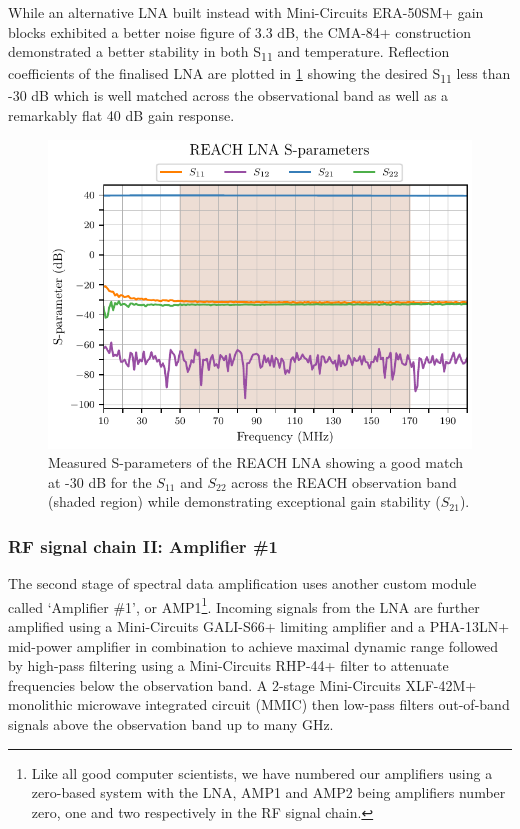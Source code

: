 While an alternative LNA built instead with Mini-Circuits ERA-50SM+ gain blocks exhibited a better noise figure of 3.3 dB, the CMA-84+ construction demonstrated a better stability in both S\textsubscript{11} and temperature. Reflection coefficients of the finalised LNA are plotted in \cref{fig:lna_sparams} showing the desired S\textsubscript{11} less than -30 dB which is well matched across the observational band as well as a remarkably flat 40 dB gain response.
\begin{figure}[t]
    \centering
    \includegraphics{lna_sparams}
    \caption{Measured S-parameters of the REACH LNA showing a good match at -30 dB for the $S_{11}$ and $S_{22}$ across the REACH observation band (shaded region) while demonstrating exceptional gain stability ($S_{21}$).}
    \label{fig:lna_sparams}
\end{figure}


\subsubsection{RF signal chain II: Amplifier \#1}
The second stage of spectral data amplification uses another custom module called ‘Amplifier \#1’, or AMP1\footnote{Like all good computer scientists, we have numbered our amplifiers using a zero-based system with the LNA, AMP1 and AMP2 being amplifiers number zero, one and two respectively in the RF signal chain.}. Incoming signals from the LNA are further amplified using a Mini-Circuits GALI-S66+ limiting amplifier and a PHA-13LN+ mid-power amplifier in combination to achieve maximal dynamic range followed by high-pass filtering using a Mini-Circuits RHP-44+ filter to attenuate frequencies below the observation band. A 2-stage Mini-Circuits XLF-42M+ monolithic microwave integrated circuit (MMIC) then low-pass filters out-of-band signals above the observation band up to many GHz.

